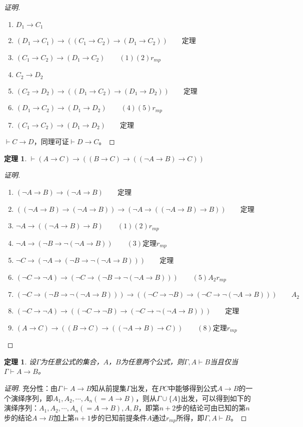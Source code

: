 \documentclass{article}
\newtheorem{Thm}{定理}
\newtheorem*{thm}{定理}
\begin{document}
\begin{CJK*}{UTF8}{gbsn}
\begin{proof}[证明]
\begin{enumerate}
  \item $D_1\to C_1$
  \item $(D_1\to C_1)\to ((C_1\to C_2)\to (D_1\to C_2))\qquad$定理
  \item $(C_1\to C_2)\to (D_1\to C_2)\qquad (1)(2)r_{mp}$
  \item $C_2\to D_2$
  \item $(C_2\to D_2)\to ((D_1\to C_2)\to (D_1\to D_2))\qquad$定理
  \item $(D_1\to C_2)\to (D_1\to D_2)\qquad (4)(5)r_{mp}$
  \item $(C_1\to C_2)\to (D_1\to D_2)\qquad $定理
\end{enumerate}
$\vdash C\to D$，同理可证$\vdash D\to C$。
  \end{proof}
  \begin{Thm}$\vdash (A\to C)\to ((B\to C)\to ((\lnot A\to B)\to C))$\end{Thm}
  \begin{proof}[证明]$\quad$
    \begin{enumerate}
      \item $(\lnot A\to B)\to (\lnot A\to B)\qquad$定理
      \item $((\lnot A\to B)\to (\lnot A\to B))\to (\lnot A\to ((\lnot A\to B)\to B))\qquad$定理
      \item $\lnot A\to ((\lnot A\to B)\to B)\qquad (1)(2)r_{mp}$
      \item $\lnot A\to (\lnot B\to \lnot(\lnot A\to B))\qquad (3)\text{定理}r_{mp}$
      \item $\lnot C\to (\lnot A\to (\lnot B\to \lnot(\lnot A\to B)))\qquad$定理
      \item $(\lnot C\to \lnot A)\to(\lnot C\to  (\lnot B\to \lnot(\lnot A\to B)))\qquad(5)A_2r_{mp}$
      \item $(\lnot C\to  (\lnot B\to \lnot(\lnot A\to B)))\to ((\lnot C\to \lnot B)\to (\lnot C \to \lnot (\lnot A\to B)))\qquad A_2$
      \item $(\lnot C\to \lnot A)\to((\lnot C\to \lnot B)\to (\lnot C \to \lnot (\lnot A\to B)))\qquad$定理
      \item $(A\to C)\to ((B\to C)\to ((\lnot A\to B)\to C))\qquad (8)\text{定理}r_{mp}$
    \end{enumerate}
  \end{proof}
\begin{thm}设$\Gamma$为任意公式的集合，$A$，$B$为任意两个公式，则$\Gamma,A\vdash B$当且仅当$\Gamma \vdash A\to B$。
\end{thm}
\begin{proof}[证明]充分性：由$\Gamma\vdash A\to B$知从前提集$\Gamma$出发，在$PC$中能够得到公式$A\to B$的一个演绎序列，即$A_1,A_2,\cdots, A_n(=A\to B)$，则从$\Gamma\cup \{A\}$出发，可以得到如下的演绎序列：$A_1,A_2,\cdots,A_n(=A\to B), A, B$，即第$n+2$步的结论可由已知的第$n$步的结论$A\to B$加上第$n+1$步的已知前提条件$A$通过$r_{mp}$所得，即$\Gamma,A\vdash B$。


\end{proof}
\end{CJK*}
\end{document}
